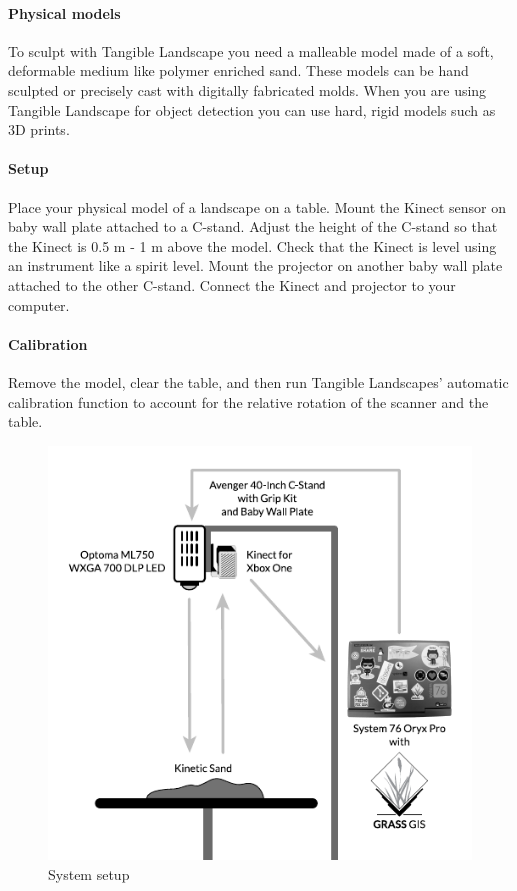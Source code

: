 \documentclass[prodmode,acmtochi]{acmsmall} %
\begin{document}
\paragraph{Physical models}
To sculpt with Tangible Landscape you need a malleable model 
made of a soft, deformable medium like polymer enriched sand. 
These models can be hand sculpted or precisely cast with digitally fabricated molds.
When you are using Tangible Landscape for object detection 
you can use hard, rigid models such as 3D prints. 

\paragraph{Setup}
Place your physical model of a landscape on a table. 
Mount the Kinect sensor on baby wall plate attached to a C-stand. 
Adjust the height of the C-stand so that the Kinect is 0.5 m - 1 m above the model. 
Check that the Kinect is level using an instrument like a spirit level.
Mount the projector on another baby wall plate attached to the other C-stand. 
Connect the Kinect and projector to your computer. 

\paragraph{Calibration}
Remove the model, clear the table, and then
run Tangible Landscapes' automatic calibration function
to account for the relative rotation of the scanner and the table.

\begin{figure}[H]
\begin{center}
		\includegraphics{images/system_setup.pdf}
	\caption{System setup}
	\label{fig:system_setup}
\end{center}
\end{figure}
\end{document}
